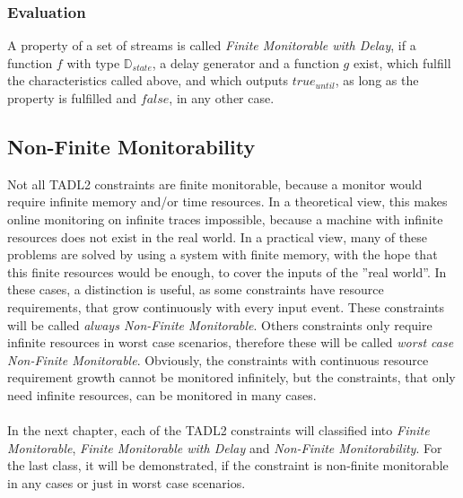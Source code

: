 		\subsubsection{Evaluation}
			A property of a set of streams is called \emph{Finite Monitorable with Delay}, if a function $f$ with type $\mathbb{D}_{state}$, a delay generator and a function $g$ exist, which fulfill the characteristics called above, and which outputs $true_{until}$, as long as the property is fulfilled and $false$, in any other case.
			
	\subsection{Non-Finite Monitorability}
		Not all TADL2 constraints are finite monitorable, because a monitor would require infinite memory and/or time resources. In a theoretical view, this makes online monitoring on infinite traces impossible, because a machine with infinite resources does not exist in the real world. In a practical view, many of these problems are solved by using a system with finite memory, with the hope that this finite resources would be enough, to cover the inputs of the ''real world''. In these cases, a distinction is useful, as some constraints have resource requirements, that grow continuously with every input event. These constraints will be called \emph{always Non-Finite Monitorable}. Others constraints only require infinite resources in worst case scenarios, therefore these will be called \emph{worst case Non-Finite Monitorable}. Obviously, the constraints with continuous resource requirement growth cannot be monitored infinitely, but the constraints, that only need infinite resources, can be monitored in many cases.\\
		\\
		In the next chapter, each of the TADL2 constraints will classified into \emph{Finite Monitorable}, \emph{Finite Monitorable with Delay} and \emph{Non-Finite Monitorability}. For the last class, it will be demonstrated, if the constraint is non-finite monitorable in any cases or just in worst case scenarios.
		
		
			
		
		
	 